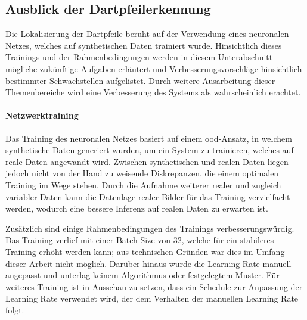 

\subsection{Ausblick der Dartpfeilerkennung}
\label{sec:ausblick_ki}

Die Lokalisierung der Dartpfeile beruht auf der Verwendung eines neuronalen Netzes, welches auf synthetischen Daten trainiert wurde. Hinsichtlich dieses Trainings und der Rahmenbedingungen werden in diesem Unterabschnitt mögliche zukünftige Aufgaben erläutert und Verbesserungsvorschläge hinsichtlich bestimmter Schwachstellen aufgelistet. Durch weitere Ausarbeitung dieser Themenbereiche wird eine Verbesserung des Systems als wahrscheinlich erachtet.

\paragraph{Netzwerktraining}

Das Training des neuronalen Netzes basiert auf einem \ac{ood}-Ansatz, in welchem synthetische Daten generiert wurden, um ein System zu trainieren, welches auf reale Daten angewandt wird. Zwischen synthetischen und realen Daten liegen jedoch nicht von der Hand zu weisende Diskrepanzen, die einem optimalen Training im Wege stehen. Durch die Aufnahme weiterer realer und zugleich variabler Daten kann die Datenlage realer Bilder für das Training vervielfacht werden, wodurch eine bessere Inferenz auf realen Daten zu erwarten ist.

Zusätzlich sind einige Rahmenbedingungen des Trainings verbesserungswürdig. Das Training verlief mit einer Batch Size von 32, welche für ein stabileres Training erhöht werden kann; aus technischen Gründen war dies im Umfang dieser Arbeit nicht möglich. Darüber hinaus wurde die Learning Rate manuell angepasst und unterlag keinem Algorithmus oder festgelegtem Muster. Für weiteres Training ist in Ausschau zu setzen, dass ein Schedule zur Anpassung der Learning Rate verwendet wird, der dem Verhalten der manuellen Learning Rate folgt.


